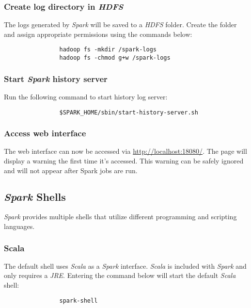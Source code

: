 \documentclass{article}
\begin{document}
            \subsubsection{Create log directory in \emph{HDFS}}
            The logs generated by \emph{Spark} will be saved to a \emph{HDFS} folder. Create the folder
            and assign appropriate permissions using the commands below:
            \begin{verbatim}
                hadoop fs -mkdir /spark-logs
                hadoop fs -chmod g+w /spark-logs
            \end{verbatim}

            \subsubsection{Start \emph{Spark} history server}
            \label{subsec:sparklog}
            Run the following command to start history log server:
            \begin{verbatim}
                $SPARK_HOME/sbin/start-history-server.sh
            \end{verbatim}

            \subsubsection{Access web interface}
            The web interface can now be accessed via \url{http://localhost:18080/}. The page will
            display a warning the first time it's accessed. This warning can be safely ignored and will
            not appear after Spark jobs are run.

        \subsection{\emph{Spark} Shells}
        \emph{Spark} provides multiple shells that utilize different programming and scripting languages.

            \subsubsection{Scala}
            The default shell uses \emph{Scala} as a \emph{Spark} interface. \emph{Scala} is included
            with \emph{Spark} and only requires a \emph{JRE}. Entering the command below will start
            the default \emph{Scala} shell:
            \begin{verbatim}
                spark-shell
            \end{verbatim}
\end{document}

